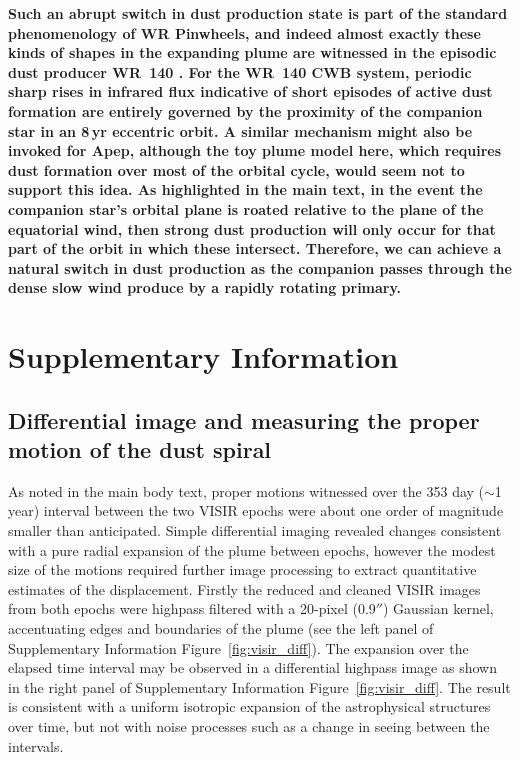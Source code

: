 \documentclass[preprint,times]{aastex61}
\begin{document}
\textbf{Such an abrupt switch in dust production state is part of the standard phenomenology of WR Pinwheels, and indeed almost exactly these kinds of shapes in the expanding plume are witnessed in the episodic dust producer WR~140 \cite{Williams2009}. For the WR~140 CWB system, periodic sharp rises in infrared flux indicative of short episodes of active dust formation are entirely governed by the proximity of the companion star in an 8\,yr eccentric orbit. A similar mechanism might also be invoked for Apep, although the toy plume model here, which requires dust formation over most of the orbital cycle, would seem not to support this idea. As highlighted in the main text, in the event the companion star's orbital plane is roated relative to the plane of the equatorial wind, then strong dust production will only occur for that part of the orbit in which these intersect. Therefore, we can achieve a natural switch in dust production as the companion passes through the dense slow wind produce by a rapidly rotating primary.}

\newpage

\section{Supplementary Information} 
\setcounter{figure}{0} 

\subsection{Differential image and measuring the proper motion of the dust spiral} \label{sec:diff}

As noted in the main body text, proper motions witnessed over the 353 day ($\sim$1\,year) interval between the two VISIR epochs were about one order of magnitude smaller than anticipated. Simple differential imaging revealed changes consistent with a pure radial expansion of the plume between epochs, however the modest size of the motions required further image processing to extract quantitative estimates of the displacement. Firstly the reduced and cleaned VISIR images from both epochs were highpass filtered with a 20-pixel (0.9$''$) Gaussian kernel, accentuating edges and boundaries of the plume (see the left panel of Supplementary Information Figure~\ref{fig:visir_diff}). The expansion over the elapsed time interval may be observed in a differential highpass image as shown in the right panel of Supplementary Information Figure~\ref{fig:visir_diff}. The result is consistent with a uniform isotropic expansion of the astrophysical structures over time, but not with noise processes such as a change in seeing between the intervals. 
\end{document}
